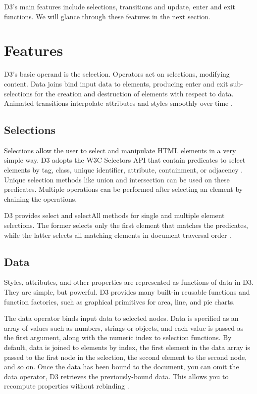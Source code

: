 \documentclass[9pt,twocolumn,twoside]{../../styles/osajnl}
\begin{document}
D3's main features include selections, transitions and update, enter and exit functions. We will glance through these features in the next section.

\section{Features}
D3’s basic operand is the selection. Operators act on selections, modifying content. Data joins bind input data to elements, producing enter and exit sub-selections for the creation and destruction of elements with respect to data. Animated transitions interpolate attributes and styles smoothly over time \cite{paper-d3}.

\subsection{Selections}
Selections allow the user to select and manipulate HTML elements in a very simple way. D3 adopts the W3C Selectors API \CE that contain predicates to select elements by tag, class, unique identifier, attribute, containment, or adjacency \cite{www-d3}. Unique selection methods like union and intersection can be used on these predicates. Multiple operations can be performed after selecting an element by chaining the operations.

D3 provides select and selectAll methods for single and multiple element selections. The former selects only the first element that matches the predicates, while the latter selects all matching elements in document traversal order \cite{paper-d3}.



\subsection{Data}
Styles, attributes, and other properties are represented as functions of data in D3. They are simple, but powerful. D3 provides many built-in reusable functions and function factories, such as graphical primitives for area, line, and pie charts.

The data operator binds input data to selected nodes. Data is specified as an array of values such as numbers, strings or objects, and each value is passed as the first argument, along with the numeric index to selection functions. By default, data is joined to elements by index, the first element in the data array is passed to the first node in the selection, the second element to the second node, and so on. Once the data has been bound to the document, you can omit the data operator, D3 retrieves the previously-bound data. This allows you to recompute properties without rebinding \cite{www-d3}.
\end{document}
